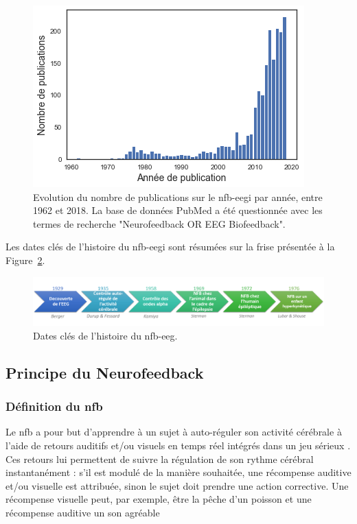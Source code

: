 \begin{figure}[h!]
  \centering
	\includegraphics[width=0.7\linewidth]{figures/chapter-1/introduction-number-of-nfb-publications} 
  \caption[Evolution du nombre de publications sur le \gls{nfb}-\gls{eegi} par année, entre 1962 et 2018.]{Evolution du nombre de publications sur le \gls{nfb}-\gls{eegi} par année, entre 1962 et 2018. La base de données PubMed a été questionnée avec les 
	termes de recherche "Neurofeedback OR EEG Biofeedback".}
  \label{Figure:introduction_number_of_nfb_publications}
\end{figure}

Les dates clés de l'histoire du \gls{nfb}-\gls{eegi} sont résumées sur la frise présentée à la Figure~\ref{Figure:introduction_nfb_history}.

\begin{figure}[h!]
  \centering
	\includegraphics[width=1\linewidth]{figures/chapter-1/introduction-nfb-history} 
  \caption{Dates clés de l'histoire du \gls{nfb}-\gls{eeg}.}
  \label{Figure:introduction_nfb_history}
\end{figure}

\subsection{Principe du Neurofeedback} \label{principe_nfb}

\subsubsection{Définition du \gls{nfb}}

Le \gls{nfb} a pour but d'apprendre à un sujet à auto-réguler son activité cérébrale à l'aide de retours auditifs et/ou visuels en temps réel
intégrés dans un jeu sérieux \citep{Wang2010, Marzbani2016}. Ces retours lui permettent de suivre la régulation de son rythme cérébral instantanément : s'il est modulé de 
la manière souhaitée, une récompense auditive et/ou visuelle est attribuée, sinon le sujet doit prendre une action corrective. Une récompense visuelle
peut, par exemple, être la pêche d'un poisson \citep{Bioulac2019} et une récompense auditive un son agréable \citep{Strehl2006}

